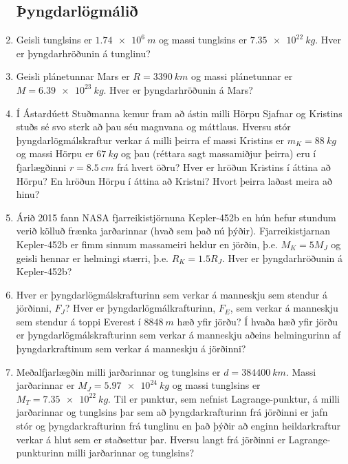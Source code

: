 \begin{enumerate}[label = \textbf{Dæmi \thechapter.\arabic*.}]

\subsection*{Þyngdarlögmálið}

\item Geisli tunglsins er $\SI{1.74e6}{m}$ og massi tunglsins er $\SI{7.35e22}{kg}$. Hver er þyngdarhröðunin á tunglinu?

\item Geisli plánetunnar Mars er $R = \SI{3390}{km}$ og massi plánetunnar er $M = \SI{6.39e23}{kg}$. Hver er þyngdarhröðunin á Mars?

\item Í Ástardúett Stuðmanna kemur fram að ástin milli Hörpu Sjafnar og Kristins stuðs sé svo sterk að þau séu magnvana og máttlaus. Hversu stór þyngdarlögmálskraftur verkar á milli þeirra ef massi Kristins er $m_K = \SI{88}{kg}$ og massi Hörpu er $\SI{67}{kg}$ og þau (réttara sagt massamiðjur þeirra) eru í fjarlægðinni $r = \SI{8.5}{cm}$ frá hvert öðru? Hver er hröðun Kristins í áttina að Hörpu? En hröðun Hörpu í áttina að Kristni? Hvort þeirra laðast meira að hinu? 

\item Árið 2015 fann NASA fjarreikistjörnuna Kepler-452b en hún hefur stundum verið kölluð frænka jarðarinnar (hvað sem það nú þýðir). Fjarreikistjarnan Kepler-452b er fimm sinnum massameiri heldur en jörðin, þ.e. $M_K = 5M_J$ og geisli hennar er helmingi stærri, þ.e. $R_K = 1.5R_J$. Hver er þyngdarhröðunin á Kepler-452b?

\item Hver er þyngdarlögmálskrafturinn sem verkar á manneskju sem stendur á jörðinni, $F_J$? Hver er þyngdarlögmálkrafturinn, $F_E$, sem verkar á manneskju sem stendur á toppi Everest í $\SI{8848}{m}$ hæð yfir jörðu? Í hvaða hæð yfir jörðu er þyngdarlögmálskrafturinn sem verkar á manneskju aðeins helmingurinn af þyngdarkraftinum sem verkar á manneskju á jörðinni?

\item Meðalfjarlægðin milli jarðarinnar og tunglsins er $d = \SI{384400}{km}$. Massi jarðarinnar er $M_J = \SI{5.97e24}{kg}$ og massi tunglsins er $M_T = \SI{7.35e22}{kg}$. Til er punktur, sem nefnist Lagrange-punktur, á milli jarðarinnar og tunglsins þar sem að þyngdarkrafturinn frá jörðinni er jafn stór og þyngdarkrafturinn frá tunglinu en það þýðir að enginn heildarkraftur verkar á hlut sem er staðsettur þar. Hversu langt frá jörðinni er Lagrange-punkturinn milli jarðarinnar og tunglsins?


\end{enumerate}
